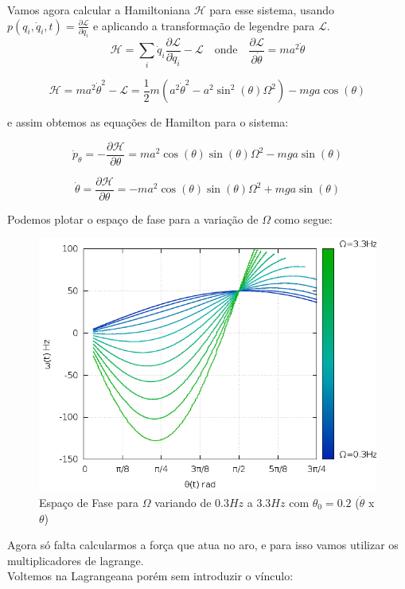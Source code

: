 \documentclass[a4paper,11pt]{exam}
\begin{document}
	Vamos agora calcular a Hamiltoniana $\mathcal{H}$ para esse sistema, usando$ p(q_i,\dot q_i ,t) = \frac{\partial \mathcal{L}}{\partial \dot q_i}$ e aplicando a transformação de legendre para $\mathcal{L}$.
	\[ \mathcal{H} = \sum_i \dot q_i \frac{\partial \mathcal{L}}{\partial \dot q_i} - \mathcal{L} \quad \text{onde} \quad \frac{\partial \mathcal{L}}{\partial \dot \theta} = ma^2 \dot\theta\]
	
	\[ \mathcal{H} = m a^2 \dot\theta^2  - \mathcal{L} = \frac{1}{2} m(a^2 \dot\theta^2 - a^2 \sin^2(\theta) \Omega^2) - mga\cos{(\theta)} \]
	
	e assim obtemos as equações de Hamilton para o sistema:
	
	\[\dot p_\theta = - \frac{\partial \mathcal{H}}{\partial \theta } = ma^2 \cos(\theta)\sin(\theta)\Omega^2 - mga\sin{(\theta)}\]	
	
	\[\dot \theta = \frac{\partial \mathcal{H}}{\partial \theta } = -ma^2 \cos(\theta)\sin(\theta) \Omega^2 + mga\sin{(\theta)}  \]
	
	Podemos plotar o espaço de fase para a variação de $\Omega$ como segue:
	
	\begin{figure}[h]
			\centering
			\includegraphics[scale=0.5]{Gr5.png}
			\caption{Espaço de Fase para $\Omega$ variando de $0.3Hz$ a $3.3Hz$ com $\theta_0 = 0.2$ ($\dot\theta$ x $\theta$)}
		\end{figure}
		
	Agora só falta calcularmos a força que atua no aro, e para isso vamos utilizar os multiplicadores de lagrange.\\
	Voltemos na Lagrangeana porém sem introduzir o vínculo:
	
\end{document}
